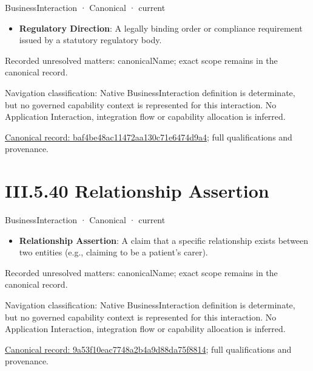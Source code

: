 \label{element:baf4be48ac11472aa130c71e6474d9a4}
{\small BusinessInteraction · Canonical · current}\par

\begin{itemize}


\item \textbf{Regulatory Direction}: A legally binding order or compliance requirement issued by a statutory regulatory body.

\end{itemize}

{\small Recorded unresolved matters: canonicalName; exact scope remains in the canonical record.}\par
{\small Navigation classification: Native BusinessInteraction definition is determinate, but no governed capability context is represented for this interaction. No Application Interaction, integration flow or capability allocation is inferred.}\par
{\footnotesize \href{../../../../../../../continuum/business/business-interaction/baf4be48ac11472aa130c71e6474d9a4.md}{Canonical record: baf4be48ac11472aa130c71e6474d9a4}; full qualifications and provenance.}\par
\section*{III.5.40 Relationship Assertion}
\label{navigation:III.5.40}

\label{element:9a53f10eac7748a2b4a9d88da75f8814}
{\small BusinessInteraction · Canonical · current}\par

\begin{itemize}


\item \textbf{Relationship Assertion}: A claim that a specific relationship exists between two entities (e.g., claiming to be a patient's carer).

\end{itemize}

{\small Recorded unresolved matters: canonicalName; exact scope remains in the canonical record.}\par
{\small Navigation classification: Native BusinessInteraction definition is determinate, but no governed capability context is represented for this interaction. No Application Interaction, integration flow or capability allocation is inferred.}\par
{\footnotesize \href{../../../../../../../continuum/business/business-interaction/9a53f10eac7748a2b4a9d88da75f8814.md}{Canonical record: 9a53f10eac7748a2b4a9d88da75f8814}; full qualifications and provenance.}\par
